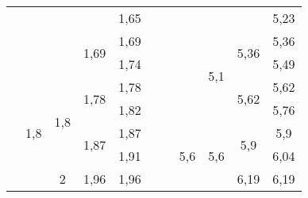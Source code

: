 \begin{table}[H]
\begin{tabular}{|c|c|c|c|c|c|c|c|c|c|c|}
                                    &                      &                      &                       & 1,65               &         &                                    &                       &                      &                       & 5,23               \\ \cline{4-5} \cline{9-11} 
                                    &                      &                      & \multirow{2}{*}{1,69} & 1,69               &         &                                    &                       & \multirow{4}{*}{5,1} & \multirow{2}{*}{5,36} & 5,36               \\ \cline{5-5} \cline{11-11} 
                                    &                      &                      &                       & 1,74               &         &                                    &                       &                      &                       & 5,49               \\ \cline{2-5} \cline{10-11} 
                                    & \multirow{8}{*}{1,8} & \multirow{4}{*}{1,8} & \multirow{2}{*}{1,78} & 1,78               &         &                                    &                       &                      & \multirow{2}{*}{5,62} & 5,62               \\ \cline{5-5} \cline{11-11} 
                                    &                      &                      &                       & 1,82               &         &                                    &                       &                      &                       & 5,76               \\ \cline{4-5} \cline{8-11} 
                                    &                      &                      & \multirow{2}{*}{1,87} & 1,87               &         &                                    & \multirow{8}{*}{5,6}  & \multirow{4}{*}{5,6} & \multirow{2}{*}{5,9}  & 5,9                \\ \cline{5-5} \cline{11-11} 
                                    &                      &                      &                       & 1,91               &         &                                    &                       &                      &                       & 6,04               \\ \cline{3-5} \cline{10-11} 
                                    &                      & \multirow{4}{*}{2}   & \multirow{2}{*}{1,96} & 1,96               &         &                                    &                       &                      & \multirow{2}{*}{6,19} & 6,19               \\ \cline{5-5} \cline{11-11} 

\end{tabular}
\end{table}
